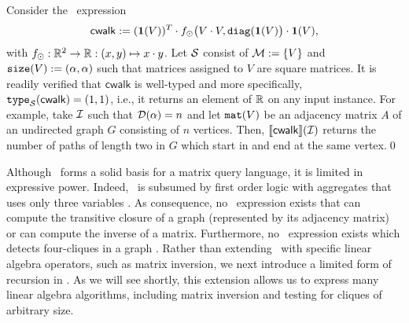 \begin{example}Consider the \lang\ expression  
$$\mathsf{cwalk}:= (\mathbf{1}(V))^T\cdot f_{\odot}\bigl(V\cdot V, \texttt{diag}(\mathbf{1}(V)\bigr)\cdot\mathbf{1}(V),$$
with $f_\odot:\mathbb{R}^2\to\mathbb{R}:(x,y)\mapsto x\cdot y$.
Let $\mathcal{S}$  consist of $\mathcal{M}:=\{V\}$ and $\texttt{size}(V):=(\alpha,\alpha)$ such that
matrices assigned to $V$ are square matrices.
It is readily verified that $\mathsf{cwalk}$ is well-typed and more specifically, $\texttt{type}_{\mathcal{S}}(\mathsf{cwalk})=(1,1)$, i.e., it returns an element of $\mathbb{R}$ on any input instance.
For example, take $\mathcal{I}$ such that $\mathcal{D}(\alpha)=n$ and let $\texttt{mat}(V)$ be an adjacency matrix $A$ of an undirected graph $G$ consisting of $n$ vertices. Then, $\llbracket \mathsf{cwalk} \rrbracket(\mathcal{I})$ returns the number of paths of length two in $G$ which start in and end at the same vertex.\qed
\end{example}
Although \lang\ forms a solid basis for a matrix query language, it is limited in expressive power. Indeed, \lang\ is subsumed by first order logic with aggregates that uses only three variables \cite{matlang}. As consequence, no \lang\ expression exists that can compute the transitive closure of a graph (represented by its adjacency matrix) or can compute the inverse of a matrix. Furthermore, no \lang\ expression exists which detects four-cliques in a graph \cite{matlang}. Rather than extending \lang\ with specific linear algebra operators, such as matrix inversion, we next introduce a limited form of recursion in \lang.
As we will see shortly, this extension allows us to express many linear algebra algorithms, including matrix inversion and testing for cliques of arbitrary size.


%
%
%


